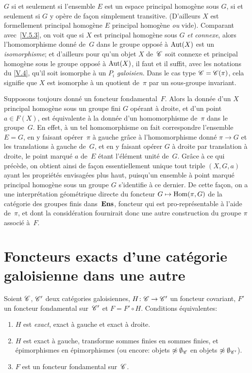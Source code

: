 \begin{remarque}
$G$ si et seulement si l'ensemble $E$ est un espace principal
homog\`ene
sous $G$,
\ie si et seulement si $G$ y op\`ere de fa\c con simplement transitive. (D'ailleurs $X$ est formellement
principal homog\`ene \sss
$E$ principal homog\`ene \emph{ou} vide). Comparant
avec~\ref{V.5.3}, on voit que si $X$ est principal homog\`ene sous
$G$ \emph{et connexe}, alors l'homomorphisme donn\'e de~$G$ dans le
groupe oppos\'e \`a $\operatorname{Aut}(X)$ est un \emph{isomorphisme}; et
d'ailleurs pour qu'un objet $X$
de~$\cal{C}$
soit connexe et principal homog\`ene sous le groupe oppos\'e \`a
$\operatorname{Aut}(X)$, il faut et il suffit, avec les notations du \No \ref{V.4}, qu'il
soit isomorphe \`a un $P_i$ \emph{galoisien}. Dans le cas type
$\cal{C}=\cal{C}(\pi)$, cela signifie que $X$ est isomorphe \`a un
quotient de~$\pi$ par un sous-groupe invariant.

Supposons toujours donn\'e un foncteur fondamental~$F$. Alors la
donn\'ee d'un
$X$ principal homog\`ene sous un groupe fini $G$ op\'erant \`a
droite, et d'un point $a\in F(X)$, est \'equivalente \`a la
donn\'ee d'un homomorphisme de~$\pi$ dans le groupe~$G$. En effet,
\`a un tel homomorphisme on fait correspondre l'ensemble $E=G$, en y
faisant op\'erer~$\pi$ \`a gauche gr\^ace \`a l'homomorphisme
donn\'e $\pi\to G$ et les translations \`a gauche de~$G$, et en y
faisant op\'erer $G$ \`a droite par translation \`a droite, le
point marqu\'e $a$ de~$E$ \'etant l'\'el\'ement unit\'e
de~$G$. Gr\^ace \`a ce qui pr\'ec\`ede, on obtient ainsi de
fa\c con essentiellement unique tout triple $(X, G, a)$ ayant les
propri\'et\'es envisag\'ees plus haut,
puisqu'un
ensemble \`a
point marqu\'e principal homog\`ene sous un groupe $G$ s'identifie
\`a ce dernier. De cette fa\c con, on a une interpr\'etation
g\'eom\'etrique directe du foncteur $G\mto \Hom(\pi, G)$ de la
cat\'egorie des groupes finis dans~$\mathbf{Ens}$, foncteur qui est
pro-repr\'esentable \`a l'aide de~$\pi$, et dont la
consid\'eration fournirait donc une autre construction du groupe
$\pi$ associ\'e \`a~$F$.
\end{remarque}

\section{Foncteurs exacts d'une cat\'egorie galoisienne dans une autre}
\label{V.6}

\begin{proposition}
\label{V.6.1}
Soient $\cal{C}$, $\cal{C'}$ deux cat\'egories galoisiennes,
$H\colon \cal{C}\to \cal{C'}$ un foncteur covariant, $F'$ un foncteur
fondamental sur~$\cal{C'}$ et $F=F' \circ H$. Conditions
\'equivalentes:
\begin{enumerate}
\item[(i)] $H$ est \emph{exact}, \ie exact \`a gauche et exact
\`a droite.
\item[(ii)] $H$ est exact \`a gauche, transforme sommes finies en
sommes finies, et \'epimorphismes en \'epimorphismes (ou encore:
objets $\not\approx \emptyset_{\cal{C}}$ en objets $\not\approx
\emptyset_{\cal{C'}}$).
\item[(iii)] $F$ est un foncteur fondamental sur~$\cal{C}$.
\end{enumerate}
\end{proposition}

